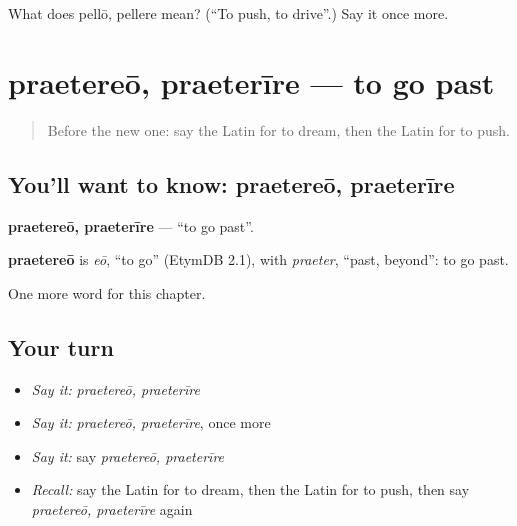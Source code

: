 \begin{tcolorbox}[breakable,colback=teal!4,colframe=teal!35!black,title={Before you move on}]
What does pellō, pellere mean? (\textquotedblleft{}To push, to drive\textquotedblright{}.) Say it once more.
\end{tcolorbox}
\section[praetereō, praeterīre]{praetereō, praeterīre — to go past}

\label{lesson:LA-C258-praetereo}



\begin{quote}
Before the new one: say the Latin for to dream, then the Latin for to push.
\end{quote}

\subsection*{You'll want to know: praetereō, praeterīre}
\textbf{praetereō, praeterīre} — \textquotedblleft{}to go past\textquotedblright{}.

\begin{cousinweb}
\textbf{praetereō} is \emph{eō}, \textquotedblleft{}to go\textquotedblright{} (EtymDB 2.1), with \emph{praeter}, \textquotedblleft{}past, beyond\textquotedblright{}: to go past.
\end{cousinweb}

\begin{grammarlens}[title={What you've built}]
One more word for this chapter.
\end{grammarlens}

\subsection*{Your turn}
\begin{itemize}
\raggedright
  \item \emph{Say it:} \emph{praetereō, praeterīre}
  \item \emph{Say it:} \emph{praetereō, praeterīre}, once more
  \item \emph{Say it:} say \emph{praetereō, praeterīre}
  \item \emph{Recall:} say the Latin for to dream, then the Latin for to push, then say \emph{praetereō, praeterīre} again
\end{itemize}

